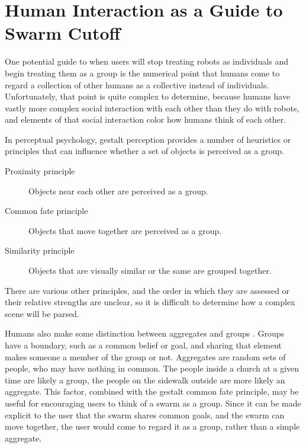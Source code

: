 \section{Human Interaction as a Guide to Swarm Cutoff}

One potential guide to when users will stop treating robots as individuals and begin treating them as a group is the numerical point that humans come to regard a collection of other humans as a collective instead of individuals. 
Unfortunately, that point is quite complex to determine, because humans have vastly more complex social interaction with each other than they do with robots, and elements of that social interaction color how humans think of each other. 

In perceptual psychology, gestalt perception provides a number of heuristics or principles that can influence whether a set of objects is perceived as a group. 
\begin{description}
\item[Proximity principle]
Objects near each other are perceived as a group.

\item[Common fate principle] 
Objects that move together are perceived as a group.

\item[Similarity principle]
Objects that are visually similar or the same are grouped together.
\end{description}	

There are various other principles, and the order in which they are assessed or their relative strengths are unclear, so it is difficult to determine how a complex scene will be parsed. 

Humans also make some distinction between aggregates and groups \cite{wilder1978perceiving}.
Groups have a boundary, such as a common belief or goal, and sharing that element makes someone a member of the group or not. 
Aggregates are random sets of people, who may have nothing in common.
The people inside a church at a given time are likely a group, the people on the sidewalk outside are more likely an aggregate. 
This factor, combined with the gestalt common fate principle, may be useful for encouraging users to think of a swarm as a group. 
Since it can be made explicit to the user that the swarm shares common goals, and the swarm can move together, the user would come to regard it as a group, rather than a simple aggregate. 

